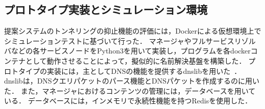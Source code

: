 %

\subsection{プロトタイプ実装とシミュレーション環境}
\label{sec:simulation}
提案システムのトンネリングの抑止機能の評価には，Dockerによる仮想環境上でシミュレーションテストに基づいて行った．
マネージャやフルサービスリゾルバなどの各サービスノードをPython3を用いて実装し，プログラムを各dockerコンテナとして動作させることによって，擬似的に名前解決基盤を構築した．
プロトタイプの実装には，主としてDNSの機能を提供するdnslibを用いた~\cite{dnslib}．
dnslibは，DNSクエリパケットのパース機能とDNSパケットを作成するのに用いた．
また，マネージャにおけるコンテンツの管理には，データベースを用いている．
データベースには，インメモリで永続性機能を持つRedisを使用した．


